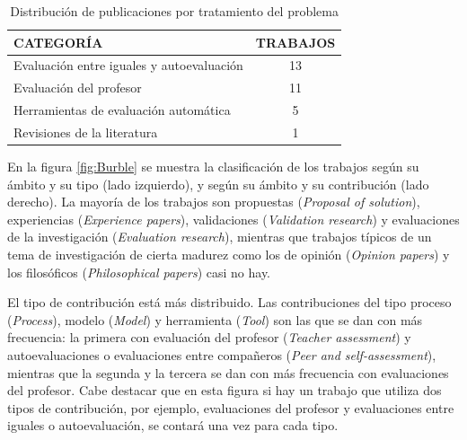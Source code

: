 \begin{table}
  \begin{center}
  \begin{tabular}{| m{10cm} | c |}
    \hline
    CATEGORÍA & TRABAJOS\\
    \hline
    \hline 
    Evaluación entre iguales y autoevaluación & 13\\
    \hline
    Evaluación del profesor & 11\\
    \hline
    Herramientas de evaluación automática & 5\\
    \hline
    Revisiones de la literatura & 1\\
    \hline
  \end{tabular}
\end{center}
\caption{Distribución de publicaciones por tratamiento del problema}
\label{tab:PublicacionesForum}
\end{table} 


En la figura \ref{fig:Burble} se muestra la clasificación de los trabajos según su ámbito y su tipo (lado izquierdo), y según su ámbito y su contribución (lado derecho). La mayoría de los trabajos son propuestas (\emph{Proposal of solution}), experiencias (\emph{Experience papers}), validaciones (\emph{Validation research}) y evaluaciones de la investigación (\emph{Evaluation research}), mientras que trabajos típicos de un tema de investigación de cierta madurez como los de opinión (\emph{Opinion papers}) y los filosóficos (\emph{Philosophical papers}) casi no hay. %

El tipo de contribución está más distribuido. Las contribuciones del tipo proceso (\emph{Process}), modelo (\emph{Model}) y herramienta (\emph{Tool}) son las que se dan con más frecuencia: la primera con evaluación del profesor (\emph{Teacher assessment}) y autoevaluaciones o evaluaciones entre compañeros (\emph{Peer and self-assessment}), mientras que la segunda y la tercera se dan con más frecuencia con evaluaciones del profesor. Cabe destacar que en esta figura si hay un trabajo que utiliza dos tipos de contribución, por ejemplo, evaluaciones del profesor y evaluaciones entre iguales o autoevaluación, se contará una vez para cada tipo.

